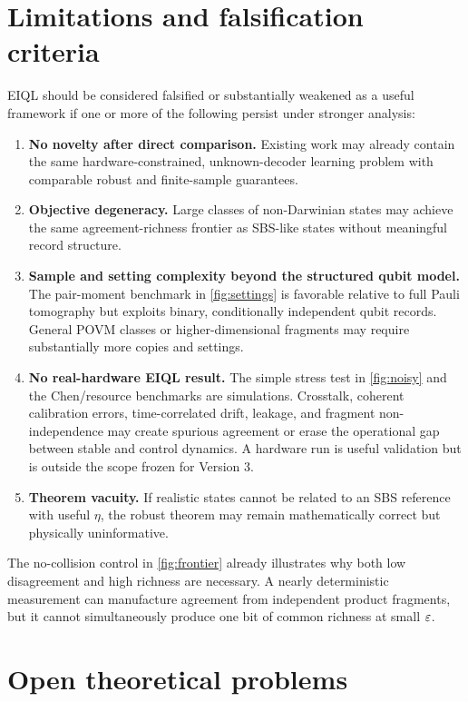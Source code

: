 \section{Limitations and falsification criteria}

EIQL should be considered falsified or substantially weakened as a useful framework if one or more of the following persist under stronger analysis:

\begin{enumerate}
\item \textbf{No novelty after direct comparison.} Existing work may already contain the same hardware-constrained, unknown-decoder learning problem with comparable robust and finite-sample guarantees.
\item \textbf{Objective degeneracy.} Large classes of non-Darwinian states may achieve the same agreement-richness frontier as SBS-like states without meaningful record structure.
\item \textbf{Sample and setting complexity beyond the structured qubit model.} The pair-moment benchmark in \cref{fig:settings} is favorable relative to full Pauli tomography but exploits binary, conditionally independent qubit records. General POVM classes or higher-dimensional fragments may require substantially more copies and settings.
\item \textbf{No real-hardware EIQL result.} The simple stress test in \cref{fig:noisy} and the Chen/resource benchmarks are simulations. Crosstalk, coherent calibration errors, time-correlated drift, leakage, and fragment non-independence may create spurious agreement or erase the operational gap between stable and control dynamics. A hardware run is useful validation but is outside the scope frozen for Version 3.
\item \textbf{Theorem vacuity.} If realistic states cannot be related to an SBS reference with useful $\eta$, the robust theorem may remain mathematically correct but physically uninformative.
\end{enumerate}

The no-collision control in \cref{fig:frontier} already illustrates why both low disagreement and high richness are necessary. A nearly deterministic measurement can manufacture agreement from independent product fragments, but it cannot simultaneously produce one bit of common richness at small $\varepsilon$.

\section{Open theoretical problems}

